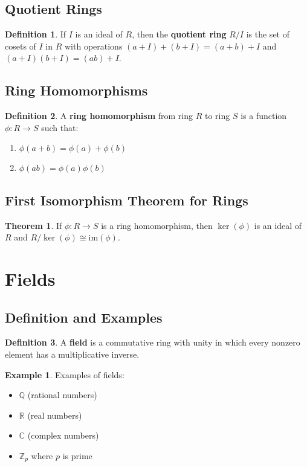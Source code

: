 \documentclass[11pt]{article}
\theoremstyle{definition}
\newtheorem{definition}{Definition}[section]
\newtheorem{theorem}{Theorem}[section]
\newtheorem{example}{Example}[section]
\begin{document}
\subsection{Quotient Rings}
\begin{definition}
If $I$ is an ideal of $R$, then the \textbf{quotient ring} $R/I$ is the set of cosets of $I$ in $R$ with operations $(a + I) + (b + I) = (a + b) + I$ and $(a + I)(b + I) = (ab) + I$.
\end{definition}

\subsection{Ring Homomorphisms}
\begin{definition}
A \textbf{ring homomorphism} from ring $R$ to ring $S$ is a function $\phi: R \to S$ such that:
\begin{enumerate}
    \item $\phi(a + b) = \phi(a) + \phi(b)$
    \item $\phi(ab) = \phi(a)\phi(b)$
\end{enumerate}
\end{definition}

\subsection{First Isomorphism Theorem for Rings}
\begin{theorem}
If $\phi: R \to S$ is a ring homomorphism, then $\ker(\phi)$ is an ideal of $R$ and $R/\ker(\phi) \cong \text{im}(\phi)$.
\end{theorem}

\section{Fields}

\subsection{Definition and Examples}
\begin{definition}
A \textbf{field} is a commutative ring with unity in which every nonzero element has a multiplicative inverse.
\end{definition}

\begin{example}
Examples of fields:
\begin{itemize}
    \item $\mathbb{Q}$ (rational numbers)
    \item $\mathbb{R}$ (real numbers)
    \item $\mathbb{C}$ (complex numbers)
    \item $\mathbb{Z}_p$ where $p$ is prime
\end{itemize}
\end{example}
\end{document}
